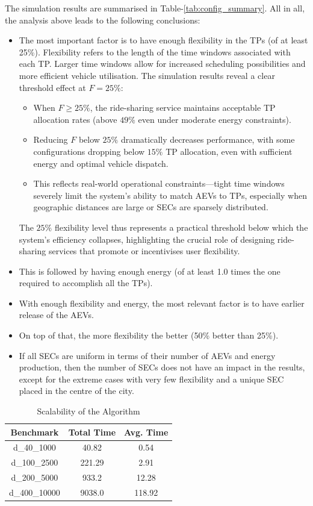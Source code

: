 The simulation results are summarised in Table-\ref{tab:config_summary}. All in all,  the analysis above leads to the following conclusions: 
\begin{itemize}
\item The most important factor is to have enough flexibility in the TPs (of at least 25\%). Flexibility refers to the length of the time windows associated with each TP. Larger time windows allow for increased scheduling possibilities and more efficient vehicle utilisation. The simulation results reveal a clear threshold effect at $F = 25\%$:
    \begin{itemize}
        \item When $F \geq 25\%$, the ride-sharing service maintains acceptable TP allocation rates (above $49\%$ even under moderate energy constraints).
        \item Reducing $F$ below $25\%$ dramatically decreases performance, with some configurations dropping below $15\%$ TP allocation, even with sufficient energy and optimal vehicle dispatch.
        \item This reflects real-world operational constraints—tight time windows severely limit the system's ability to match AEVs to TPs, especially when geographic distances are large or SECs are sparsely distributed.
    \end{itemize}
The $25\%$ flexibility level thus represents a practical threshold below which the system's efficiency collapses, highlighting the crucial role of designing ride-sharing services that promote or incentivises user flexibility.
\item This is followed by having enough energy (of at least 1.0 times the one required to accomplish all the TPs).
\item With enough flexibility and energy, the most relevant factor is to have earlier release of the AEVs.
\item On top of that, the more flexibility the better (50\% better than 25\%).
\item If all SECs are uniform in terms of their number of AEVs and energy production, then the number of SECs does not have an impact in the results, except for the extreme cases with very few flexibility and a unique SEC placed in the centre of the city.
\end{itemize}
\begin{table}[b]
\begin{center}
\begin{tabular}{|c|c|c|}
\hline
\textbf{Benchmark} & \textbf{Total Time} & \textbf{Avg. Time} \\
\hline
d\_40\_1000 & 40.82 & 0.54\\
d\_100\_2500 & 221.29 & 2.91\\
d\_200\_5000 & 933.2 & 12.28\\
d\_400\_10000 & 9038.0 & 118.92\\
\hline
\end{tabular}
\end{center}
\caption{Scalability of the Algorithm}
\label{scalability_analysis_alg}
\end{table}

